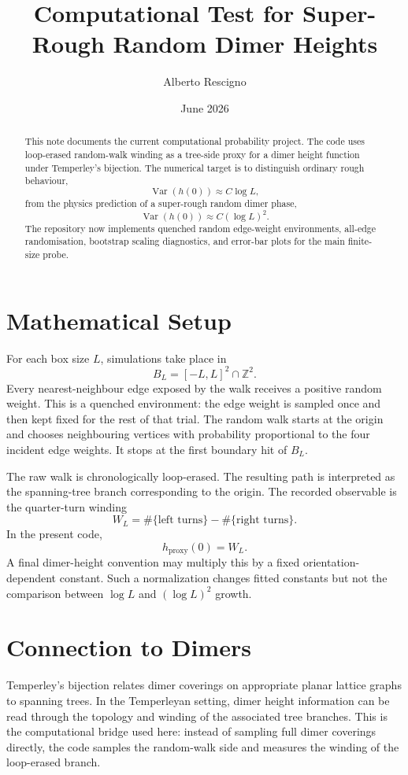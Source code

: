 \documentclass[11pt]{article}
\title{Computational Test for Super-Rough Random Dimer Heights}
\author{Alberto Rescigno}
\date{June 2026}
\begin{document}
\maketitle

\begin{abstract}
This note documents the current computational probability project.  The code
uses loop-erased random-walk winding as a tree-side proxy for a dimer height
function under Temperley's bijection.  The numerical target is to distinguish
ordinary rough behaviour,
\[
  \operatorname{Var}(h(0)) \approx C\log L,
\]
from the physics prediction of a super-rough random dimer phase,
\[
  \operatorname{Var}(h(0)) \approx C(\log L)^2 .
\]
The repository now implements quenched random edge-weight environments, all-edge
randomisation, bootstrap scaling diagnostics, and error-bar plots for the main
finite-size probe.
\end{abstract}

\section{Mathematical Setup}

For each box size \(L\), simulations take place in
\[
  B_L=[-L,L]^2\cap \mathbb{Z}^2 .
\]
Every nearest-neighbour edge exposed by the walk receives a positive random
weight.  This is a quenched environment: the edge weight is sampled once and
then kept fixed for the rest of that trial.  The random walk starts at the
origin and chooses neighbouring vertices with probability proportional to the
four incident edge weights.  It stops at the first boundary hit of \(B_L\).

The raw walk is chronologically loop-erased.  The resulting path is interpreted
as the spanning-tree branch corresponding to the origin.  The recorded
observable is the quarter-turn winding
\[
  W_L=\#\{\text{left turns}\}-\#\{\text{right turns}\}.
\]
In the present code,
\[
  h_{\mathrm{proxy}}(0)=W_L .
\]
A final dimer-height convention may multiply this by a fixed
orientation-dependent constant.  Such a normalization changes fitted constants
but not the comparison between \(\log L\) and \((\log L)^2\) growth.

\section{Connection to Dimers}

Temperley's bijection relates dimer coverings on appropriate planar lattice
graphs to spanning trees.  In the Temperleyan setting, dimer height information
can be read through the topology and winding of the associated tree branches.
This is the computational bridge used here: instead of sampling full dimer
coverings directly, the code samples the random-walk side and measures the
winding of the loop-erased branch.
\end{document}
